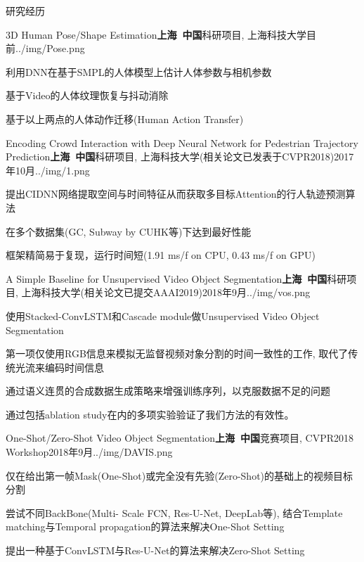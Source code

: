 \documentclass{resume_ch} %
\begin{document}
\begin{rSection}{研究经历}

\begin{rSubsection}{3D Human Pose/Shape Estimation}{\bf 上海\ 中国}{科研项目, 上海科技大学}{目前}{../img/Pose.png}
    \item 利用DNN在基于SMPL的人体模型上估计人体参数与相机参数
    \item 基于Video的人体纹理恢复与抖动消除
    \item 基于以上两点的人体动作迁移(Human Action Transfer)
\end{rSubsection}

\begin{rSubsection}{Encoding Crowd Interaction with Deep Neural Network for Pedestrian Trajectory Prediction}{\bf 上海\ 中国}{科研项目, 上海科技大学(相关论文已发表于CVPR2018)}{2017年10月}{../img/1.png}
    \item 提出CIDNN网络提取空间与时间特征从而获取多目标Attention的行人轨迹预测算法
    \item 在多个数据集(GC, Subway by CUHK等)下达到最好性能
    \item 框架精简易于复现，运行时间短(1.91 ms/f on CPU, 0.43 ms/f on GPU)
\end{rSubsection}


\begin{rSubsection}{A Simple Baseline for Unsupervised Video Object Segmentation}{\bf 上海\ 中国}{科研项目, 上海科技大学(相关论文已提交AAAI2019)}{2018年9月}{../img/vos.png}
    \item 使用Stacked-ConvLSTM和Cascade module做Unsupervised Video Object Segmentation
    \item 第一项仅使用RGB信息来模拟无监督视频对象分割的时间一致性的工作, 取代了传统光流来编码时间信息
    \item 通过语义连贯的合成数据生成策略来增强训练序列，以克服数据不足的问题
    \item 通过包括ablation study在内的多项实验验证了我们方法的有效性。
\end{rSubsection}


\begin{rSubsection}{One-Shot/Zero-Shot Video Object Segmentation}{\bf 上海\ 中国}{竞赛项目, CVPR2018 Workshop}{2018年9月}{../img/DAVIS.png}
    \item 仅在给出第一帧Mask(One-Shot)或完全没有先验(Zero-Shot)的基础上的视频目标分割
    \item 尝试不同BackBone(Multi- Scale FCN, Res-U-Net, DeepLab等), 结合Template matching与Temporal propagation的算法来解决One-Shot Setting
    \item 提出一种基于ConvLSTM与Res-U-Net的算法来解决Zero-Shot Setting
\end{rSubsection}



\end{rSection}
\end{document}

